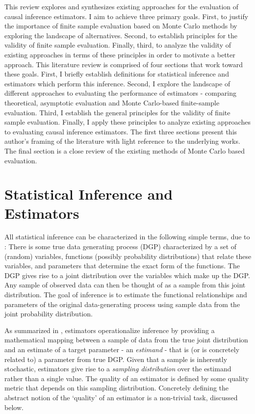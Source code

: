 \documentclass[../main.tex]{subfiles}
\begin{document}
This review explores and synthesizes existing approaches for the evaluation of causal inference estimators. I aim to achieve three primary goals. First, to justify the importance of finite sample evaluation based on Monte Carlo methods by exploring the landscape of alternatives. Second, to establish principles for the validity of finite sample evaluation. Finally, third, to analyze the validity of existing approaches in terms of these principles in order to motivate a better approach. This literature review is comprised of four sections that work toward these goals. First, I briefly establish definitions for statistical inference and estimators which perform this inference. Second, I explore the landscape of different approaches to evaluating the performance of estimators - comparing theoretical, asymptotic evaluation and Monte Carlo-based finite-sample evaluation. Third, I establish the general principles for the validity of finite sample evaluation. Finally, I apply these principles to analyze existing approaches to evaluating causal inference estimators. The first three sections present this author’s framing of the literature with light reference to the underlying works. The final section is a close review of the existing methods of Monte Carlo based evaluation.\par

\section{Statistical Inference and Estimators}

\vspace{\baselineskip}
All statistical inference can be characterized in the following simple terms, due to \cite{Pearl2009CausalOverview}: There is some true data generating process (DGP) characterized by a set of (random) variables, functions (possibly probability distributions) that relate these variables, and parameters that determine the exact form of the functions. The DGP gives rise to a joint distribution over the variables which make up the DGP. Any sample of observed data can then be thought of as a sample from this joint distribution. The goal of inference is to estimate the functional relationships and parameters of the original data-generating process using sample data from the joint probability distribution.\par


\vspace{\baselineskip}
As summarized in \cite{Calder1953StatisticalInference}, estimators operationalize inference by providing a mathematical mapping between a sample of data from the true joint distribution and an estimate of a target parameter - an \textit{estimand} - that is (or is concretely related to) a parameter from true DGP. Given that a sample is inherently stochastic, estimators give rise to a \textit{sampling distribution }over the estimand rather than a single value. The quality of an estimator is defined by some quality metric that depends on this sampling distribution. Concretely defining the abstract notion of the ‘quality’ of an estimator is a non-trivial task, discussed below.\par
\end{document}
